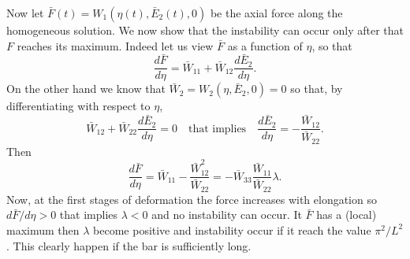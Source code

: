 \documentclass[a4paper,10pt,oneside]{amsbook}
\numberwithin{section}{chapter}
\numberwithin{equation}{chapter}
\theoremstyle{definition}
\newcommand{\dind}[2]{\frac{\partial #1}{\partial #2}}
\begin{document}

Now let $\bar{F}(t)=W_1(\eta(t),\bar{E}_2(t),0)$ be the axial force along the homogeneous solution. We now show that the instability can occur only after that $F$ reaches its maximum. Indeed let us view $\bar{F}$ as a function of $\eta$, so that
\[
\frac{d\bar{F}}{d\eta}=\bar W_{11}+\bar W_{12}\frac{d\bar E_2}{d\eta}.
\]
On the other hand we know that $\bar W_2=W_2(\eta,\bar{E}_2,0)=0$ so that, by differentiating with respect to $\eta$,
\[
\bar W_{12}+\bar W_{22}\frac{d\bar E_2}{d\eta}=0\quad\text{that implies}\quad\frac{d\bar E_2}{d\eta}=-\frac{\bar W_{12}}{\bar W_{22}}.
\]
Then
\[
\frac{d\bar F}{d\eta}=\bar W_{11}-\frac{\bar W_{12}^2}{\bar W_{22}}=-\bar W_{33}\frac{\bar W_{11}}{\bar W_{22}}\lambda.
\]
Now, at the first stages of deformation the force increases with elongation so $d\bar F/d\eta>0$ that implies $\lambda<0$ and no instability can occur. It $\bar{F}$ has a (local) maximum then $\lambda$ become positive and instability occur if it reach the value $\pi^2/L^2$. This clearly happen if the bar is sufficiently long.
\end{document}
